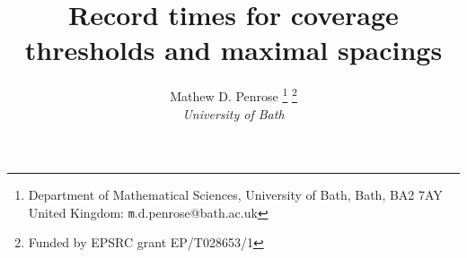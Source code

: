 \documentclass[12pt]{article}
\begin{document}

\author{
Mathew D. Penrose
         \thanks{Department of Mathematical Sciences, University of Bath, Bath, BA2 7AY United Kingdom: {\texttt m.d.penrose@bath.ac.uk} }
        \thanks{Funded by EPSRC grant EP/T028653/1}
\\
{\normalsize{\em University of Bath}} }






\title{Record times for  coverage thresholds and maximal spacings }



\maketitle
\end{document}
